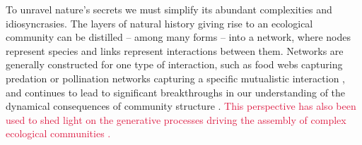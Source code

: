 \documentclass[twocolumn,preprintnumbers,amsmath,amssymb,superscriptaddress,linenumbers]{revtex4-1}
\newcommand{\rev}[1]{\textcolor{crimson}{#1}}
\begin{document}
\maketitle





To unravel nature's secrets we must simplify its abundant complexities and idiosyncrasies.
The layers of natural history giving rise to an ecological community can be distilled -- among many forms -- into a network, where nodes represent species and links represent interactions between them.
Networks are generally constructed for one type of interaction, such as food webs capturing predation \cite{Paine1966,Dunne2002,Pascual2006} or pollination networks capturing a specific mutualistic interaction \cite{Bascompte2013}, and continues to lead to significant breakthroughs in our understanding of the dynamical consequences of community structure \cite{May1972,Gross2009,Allesina2012}.
\rev{This perspective has also been used to shed light on the generative processes driving the assembly of complex ecological communities \cite{Montoya2003,Bascompte2009}.}

\end{document}
